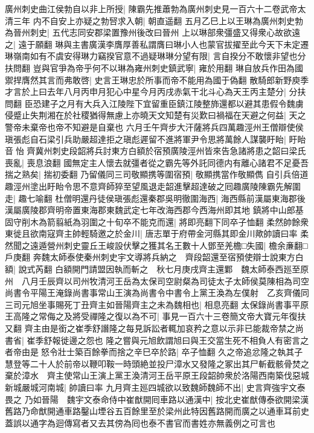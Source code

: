 廣州刺史曲江侯勃自以非上所授|{
	陳霸先推蕭勃為廣州刺史見一百六十二卷武帝太清三年}
内不自安上亦疑之勃唘求入朝|{
	朝直遥翻}
五月乙巳上以王琳為廣州刺史勃為晉州刺史|{
	五代志同安郡梁置豫州後改曰晉州}
上以琳部衆彊盛又得衆心故欲遠之|{
	遠于願翻}
琳與主書廣漢李膺厚善私謂膺曰琳小人也蒙官拔擢至此今天下未定遷琳嶺南如有不虞安得琳力竊揆官意不過疑琳琳分望有限|{
	言自揆分不敢懷非望也分扶問翻}
豈與官爭為帝乎何不以琳為雍州刺史鎮武寧|{
	雍於用翻}
琳自放兵作田為國禦捍膺然其言而弗敢啓|{
	史言王琳忠於所事而帝不能用為國于偽翻}
散騎郎新野庾季才言於上曰去年八月丙申月犯心中星今月丙戌赤氣干北斗心為天王丙主楚分|{
	分扶問翻}
臣恐建子之月有大兵入江陵陛下宜留重臣鎮江陵整斾還都以避其患假令魏虜侵蹙止失荆湘在於社稷猶得無慮上亦曉天文知楚有災歎曰禍福在天避之何益|{
	天之警帝未棄帝也帝不知避是自棄也}
六月壬午齊步大汗薩將兵四萬趣涇州王僧辯使侯瑱張彪自石梁引兵助嚴超達拒之瑱彪遲留不進將軍尹令思將萬餘人謀襲盱眙|{
	盱眙音怡}
齊冀州刺史段韶將兵討東方白額於宿預廣陵涇州皆來告急諸將患之韶曰梁氏喪亂|{
	喪息浪翻}
國無定主人懷去就彊者從之霸先等外託同德内有離心諸君不足憂吾揣之熟矣|{
	揣初委翻}
乃留儀同三司敬顯携等圍宿預|{
	敬顯携當作敬顯儁}
自引兵倍道趣涇州塗出盱眙令思不意齊師猝至望風退走韶進擊超達破之囘趣廣陵陳霸先解圍走|{
	趣七喻翻}
杜僧明還丹徒侯瑱張彪還秦郡吳明徹圍海西|{
	海西縣前漢屬東海郡後漢屬廣陵郡齊明帝置東海郡東魏武定七年改海西郡今西海州即其地}
鎮將中山郎基固守削木為箭翦紙為羽圍之十旬卒不能克而還|{
	將即亮翻下同卒子恤翻}
柔然帥餘衆東徙且欲南寇齊主帥輕騎邀之於金川|{
	唐志單于府帶金河縣其即金川歟帥讀曰率}
柔然聞之遠遁營州刺史靈丘王峻設伏擊之獲其名王數十人鄧至羌檐□失國|{
	檐余亷翻□戶庚翻}
奔魏太師泰使秦州刺史宇文導將兵納之　齊段韶還至宿預使辯士說東方白額|{
	說式芮翻}
白額開門請盟因執而斬之　秋七月庚戌齊主還鄴　魏太師泰西廵至原州　八月壬辰齊以司州牧清河王岳為太保司空尉粲為司徒太子太師侯莫陳相為司空尚書令平陽王淹錄尚書事常山王演為尚書令中書令上黨王渙為左僕射　乙亥齊儀同三司元旭坐事賜死丁丑齊主如晉陽齊主之未為魏相也|{
	相息亮翻}
太保錄尚書事平原王高隆之常侮之及將受禪隆之復以為不可|{
	事見一百六十三卷簡文帝大寶元年復扶又翻}
齊主由是銜之崔季舒譖隆之每見訴訟者輒加哀矜之意以示非已能裁帝禁之尚書省|{
	崔季舒報徙邊之怨也}
隆之嘗與元旭飲謂旭曰與王交當生死不相負人有密言之者帝由是怒令壯士築百餘拳而捨之辛巳卒於路|{
	卒子恤翻}
久之帝追忿隆之執其子慧登等二十人於前帝以鞭叩鞍一時頭絶並投尸漳水又發隆之冢出其尸斬截骸骨焚之棄於漳水　齊主使常山王演上黨王渙清河王岳平原王段韶帥衆於洛陽西南築伐惡城新城嚴城河南城|{
	帥讀曰率}
九月齊主廵四城欲以致魏師魏師不出|{
	史言齊強宇文泰畏之}
乃如晉陽　魏宇文泰命侍中崔猷開囘車路以通漢中|{
	按北史崔猷傳泰欲開梁漢舊路乃命猷開通車路鑿山堙谷五百餘里至於梁州此特因舊路開而廣之以通車耳前史蓋誤以通字為迴傳寫者又去其傍為囘也泰不書官而書姓亦無義例之可言也}
